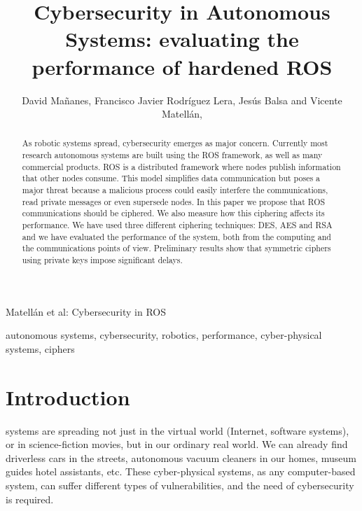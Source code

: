 \documentclass[journal,twoside]{JoPhA}
\begin{document}
\title{Cybersecurity in Autonomous Systems: evaluating the performance of hardened ROS}

\author{David Ma\~nanes, Francisco Javier Rodr\'iguez Lera, Jes\'us Balsa and Vicente Matell\'an,
}


%
{Matell\'an et al: Cybersecurity in ROS}
\maketitle


\begin{abstract}
As robotic systems spread, cybersecurity emerges as major concern. Currently most research autonomous systems are built using the ROS framework, as well as many commercial products. ROS is a distributed framework where nodes publish information that other nodes consume. This model simplifies data communication but poses a major threat because a malicious process could easily interfere the communications, read private messages or even supersede nodes. In this paper we propose that ROS communications should be ciphered. We also measure how this ciphering affects its performance. We have used three different ciphering techniques: DES, AES and RSA and we have evaluated the performance of the system, both from the computing  and the communications points of view. Preliminary results show that symmetric ciphers using private keys impose significant delays.

\end{abstract}


\begin{IEEEkeywords}
autonomous systems, cybersecurity, robotics, performance, cyber-physical systems, ciphers
\end{IEEEkeywords}


\section{Introduction}

 systems are spreading not just in the virtual world (Internet, software systems), or in science-fiction movies, but in our ordinary real world. We can already find driverless cars in the streets, autonomous vacuum cleaners in our homes, museum guides hotel assistants, etc. These cyber-physical systems, as any computer-based system, can suffer different types of vulnerabilities, and the  need of cybersecurity \cite{Morante2015} is required. 
\end{document}
